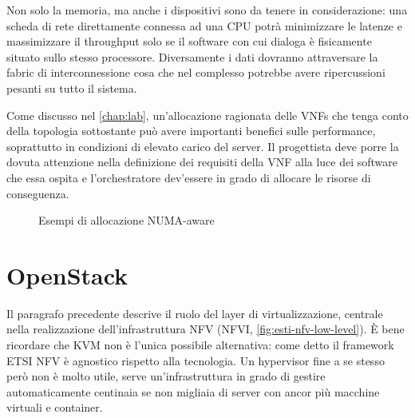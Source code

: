 Non solo la memoria, ma anche i dispositivi sono da tenere in considerazione: una scheda di rete direttamente connessa ad una CPU potrà minimizzare le latenze e massimizzare il throughput solo se il software con cui dialoga è fisicamente situato sullo stesso processore. Diversamente i dati dovranno attraversare la fabric di interconnessione cosa che nel complesso potrebbe avere ripercussioni pesanti su tutto il sistema.

Come discusso nel \cref{chap:lab}, un'allocazione ragionata delle VNFs che tenga conto della topologia sottostante può avere importanti benefici sulle performance, soprattutto in condizioni di elevato carico del server. Il progettista deve porre la dovuta attenzione nella definizione dei requisiti della VNF alla luce dei software che essa ospita e l'orchestratore dev'essere in grado di allocare le risorse di conseguenza.

\begin{figure}[htb]%
    \centering
    \qquad
    \caption{Esempi di allocazione NUMA-aware}%
    \label{fig:example}%
\end{figure}

\section{OpenStack}

Il paragrafo precedente descrive il ruolo del layer di virtualizzazione, centrale nella realizzazione dell'infrastruttura NFV (NFVI, \cref{fig:esti-nfv-low-level}). È bene ricordare che KVM non è l'unica possibile alternativa: come detto il framework ETSI NFV è agnostico rispetto alla tecnologia. Un hypervisor fine a se stesso però non è molto utile, serve un'infrastruttura in grado di gestire automaticamente centinaia se non migliaia di server con ancor più macchine virtuali e container.

